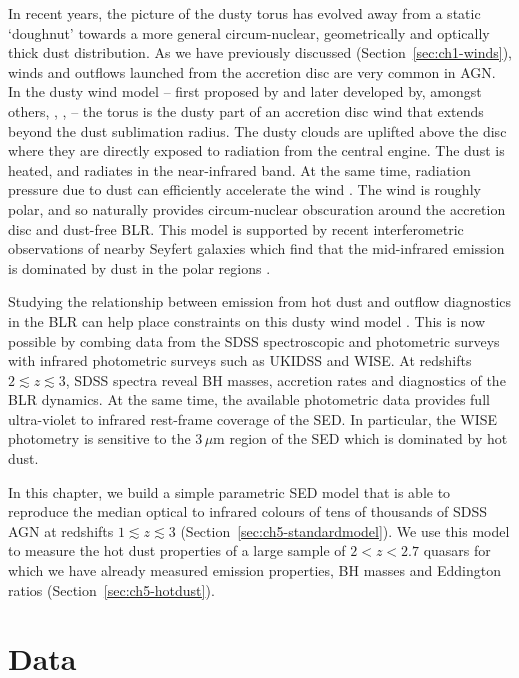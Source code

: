 In recent years, the picture of the dusty torus has evolved away from a static `doughnut' towards a more general circum-nuclear, geometrically and optically thick dust distribution. 
As we have previously discussed (Section~\ref{sec:ch1-winds}), winds and outflows launched from the accretion disc are very common in AGN. 
In the dusty wind model -- first proposed by \citet{konigl94} and later developed by, amongst others, \citet{everett05}, \citet{elitzur06}, \citet{keating12} -- the torus is the dusty part of an accretion disc wind that extends beyond the dust sublimation radius.  
The dusty clouds are uplifted above the disc where they are directly exposed to radiation from the central engine. 
The dust is heated, and radiates in the near-infrared band.
At the same time, radiation pressure due to dust can efficiently accelerate the wind \citep[e.g.][]{fabian12}. 
The wind is roughly polar, and so naturally provides circum-nuclear obscuration around the accretion disc and dust-free BLR.   
This model is supported by recent interferometric observations of nearby Seyfert galaxies which find that the mid-infrared emission is dominated by dust in the polar regions \citep[e.g.][]{raban09,honig12,honig13,tristram14,lopez-gonzaga16}.

Studying the relationship between emission from hot dust and outflow diagnostics in the BLR can help place constraints on this dusty wind model \citep[e.g.][]{wang13}. 
This is now possible by combing data from the SDSS spectroscopic and photometric surveys with infrared photometric surveys such as UKIDSS and WISE. 
At redshifts $2\lesssim z \lesssim3$, SDSS spectra reveal BH masses, accretion rates and diagnostics of the BLR dynamics. 
At the same time, the available photometric data provides full ultra-violet to infrared rest-frame coverage of the SED.
In particular, the WISE photometry is sensitive to the $3$\,$\mu$m region of the SED which is dominated by hot dust. 

In this chapter, we build a simple parametric SED model that is able to reproduce the median optical to infrared colours of tens of thousands of SDSS AGN at redshifts $1 \lesssim z \lesssim 3$ (Section~\ref{sec:ch5-standardmodel}).
We use this model to measure the hot dust properties of a large sample of $2 < z < 2.7$ quasars for which we have already measured  emission properties, BH masses and Eddington ratios (Section~\ref{sec:ch5-hotdust}).

\section{Data}

